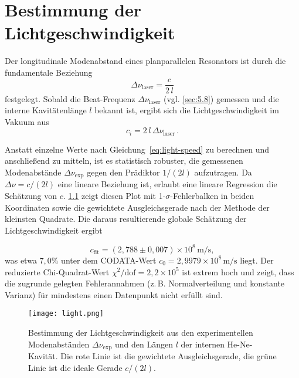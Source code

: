  
\chapter{Bestimmung der Lichtgeschwindigkeit}

Der longitudinale Modenabstand eines planparallelen Resonators ist durch die fundamentale Beziehung  
\begin{equation*}
  \Delta\nu_{\mathrm{laser}} = \frac{c}{2\,l}
\end{equation*}
festgelegt. 
Sobald die Beat-Frequenz \(\Delta\nu_{\mathrm{laser}}\) (vgl. \cref{sec:5.8}) gemessen und die interne Kavitätenlänge \(l\) bekannt ist, ergibt sich die Lichtgeschwindigkeit im Vakuum aus  
\begin{equation} \label{eq:light-speed}
  c_i = 2\,l\,\Delta\nu_{\mathrm{laser}}\,.
\end{equation}

Anstatt einzelne Werte nach Gleichung~\eqref{eq:light-speed} zu berechnen und anschließend zu mitteln, ist es statistisch robuster, die gemessenen Modenabstände \(\Delta\nu_{\mathrm{exp}}\) gegen den Prädiktor \(1/(2l)\) aufzutragen. 
Da \(\Delta\nu = c/(2l)\) eine lineare Beziehung ist, erlaubt eine lineare Regression die Schätzung von \(c\). 
\cref{fig:light-speed} zeigt diesen Plot mit 1-\(\sigma\)-Fehlerbalken in beiden Koordinaten sowie die gewichtete Ausgleichsgerade nach der Methode der kleinsten Quadrate. Die daraus resultierende globale Schätzung der Lichtgeschwindigkeit ergibt  

\[
  c_{\mathrm{fit}} = (2{,}788 \pm 0{,}007)\times10^{8}\,\mathrm{m/s},
\]  
was etwa \(7{,}0\%\) unter dem CODATA-Wert \(c_0 = 2{,}9979\times10^{8}\,\mathrm{m/s}\) liegt. 
Der reduzierte Chi-Quadrat-Wert  
\(\chi^2/\mathrm{dof} = 2{,}2\times10^5\)  
ist extrem hoch und zeigt, dass die zugrunde gelegten Fehlerannahmen (z.\,B. Normalverteilung und konstante Varianz) für mindestens einen Datenpunkt nicht erfüllt sind.

\begin{figure}
  \centering
  \texttt{[image: light.png]}
  \caption{Bestimmung der Lichtgeschwindigkeit aus den experimentellen Modenabständen \(\Delta\nu_{\mathrm{exp}}\) und den Längen \(l\) der internen He-Ne-Kavität. Die rote Linie ist die gewichtete Ausgleichsgerade, die grüne Linie ist die ideale Gerade \(c/(2l)\).}
  \label{fig:light-speed}
\end{figure}

